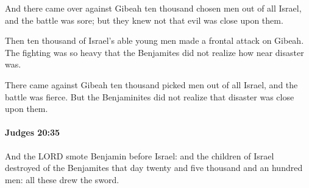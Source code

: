 			\begin{versebox}
					\item[BHS] 
					\item[ASV] And there came over against Gibeah ten thousand chosen men out of all Israel, and the battle was sore; but they knew not that evil was close upon them.
					\item[NIV] Then ten thousand of Israel’s able young men made a frontal attack on Gibeah. The fighting was so heavy that the Benjamites did not realize how near disaster was.
					\item[NRSV] There came against Gibeah ten thousand picked men out of all Israel, and the battle was fierce. But the Benjaminites did not realize that disaster was close upon them.
			\end{versebox}

		\paragraph{Judges 20:35} %
			\label{JUDGES-20-35}

			And the LORD smote Benjamin before Israel: and the children of Israel destroyed of the Benjamites that day twenty and five thousand and an hundred men: all these drew the sword.


